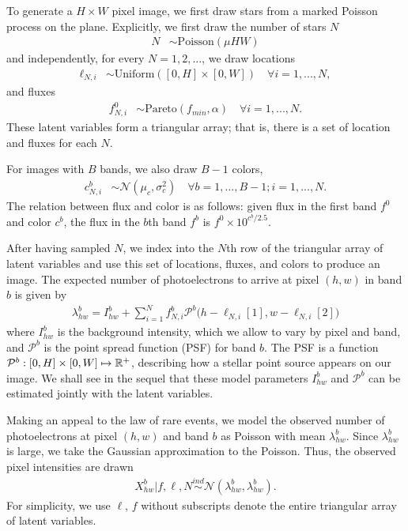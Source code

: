 To generate a $H \times W$ pixel image, we first draw stars from a marked Poisson process
on the plane. Explicitly, we first draw the number of stars $N$
\begin{align}
	N &\sim \text{Poisson}(\mu HW)
\end{align}
and independently, for every $N = 1, 2, ... $, we draw locations 
\begin{align}
  \ell_{N, i} &\sim \text{Uniform}([0, H] \times [0, W]) \quad \forall i = 1, ..., N, 
 \end{align}
 and fluxes
 \begin{align}
  f_{N, i}^{0} & \sim \text{Pareto}(f_{min}, \alpha) \quad \forall i = 1, ..., N. 
  \label{eq:flux_prior}
\end{align}
These latent variables form a triangular array; that is, 
there is a set of location and fluxes for each $N$. 

For images with $B$ bands, we also draw $B - 1$ colors,
\begin{align}
  c_{N, i}^{b}  & \sim \mathcal{N}(\mu_c, \sigma^2_c) \quad \forall b = 1, ..., B - 1; i = 1, ..., N.
\end{align}
The relation between flux and color is as follows: 
given flux in the first band $f^0$ and color $c^b$, 
the flux in the $b$th band $f^b$ is $f^0 \times 10^{c^b / 2.5}$.

After having sampled $N$,
we index into the $N$th row of the triangular array of latent variables
and use this set of locations, fluxes, and colors to produce an image.
The expected number of photoelectrons to arrive at pixel $(h,w)$ in band $b$ is given by
\begin{align}
  \lambda^b_{hw} = I^{b}_{hw} + \sum_{i = 1}^N f_{N, i}^b \mathcal{P}^b\big(h - \ell_{N, i}[1], w - \ell_{N,i}[2]\big)
  \label{eq:expected_intensity}
\end{align}
where $I^{b}_{hw}$ is the background intensity, which we allow to vary by pixel and band,
and $\mathcal{P}^b$ is the point spread function (PSF) for band $b$. The PSF
is a function $\mathcal{P}^b : [0, H] \times [0, W] \mapsto \mathbb{R}^+$,
describing how a stellar point source appears
on our image. We shall see in the sequel
that these model
parameters $I^{b}_{hw}$ and $\mathcal{P}^b$ can be estimated jointly with
the latent variables.

Making an appeal to the law of rare events, we model the
observed number of photoelectrons at pixel $(h,w)$ and band $b$ as Poisson
with mean $\lambda^b_{hw}$. Since $\lambda^b_{hw}$ is large,
we take the Gaussian approximation to the Poisson.
Thus, the observed pixel intensities are drawn
\begin{align}
  X_{hw}^b | f, \ell, N \overset{ind}{\sim} \mathcal{N}(\lambda^b_{hw}, \lambda^b_{hw}).
\end{align}
For simplicity, we use $\ell$, $f$ without subscripts  
denote the entire triangular array of latent variables. 
